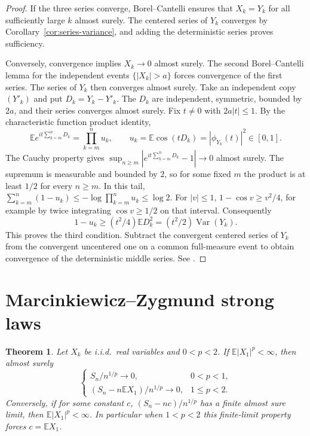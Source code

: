 \documentclass[11pt,oneside,openany]{book}
\newcommand{\E}{\mathbb{E}}
\DeclareMathOperator{\Var}{Var}
\theoremstyle{plain}
\newtheorem{theorem}{Theorem}[chapter]
\theoremstyle{definition}
\theoremstyle{remark}
\begin{document}
\begin{proof}
If the three series converge, Borel--Cantelli ensures that \(X_k=Y_k\)
for all sufficiently large \(k\) almost surely. The centered series
of \(Y_k\) converges by Corollary~\ref{cor:series-variance}, and adding
the deterministic series proves sufficiency.

Conversely, convergence implies \(X_k\to0\) almost surely. The second
Borel--Cantelli lemma for the independent events \(\{|X_k|>a\}\)
forces convergence of the first series. The series of \(Y_k\) then
converges almost surely. Take an independent copy \((Y'_k)\) and put
\(D_k=Y_k-Y'_k\). The \(D_k\) are independent, symmetric, bounded by
\(2a\), and their series converges almost surely. Fix \(t\ne0\) with
\(2a|t|\le1\). By the characteristic function product identity,
\[
  \E e^{it\sum_{k=m}^n D_k}=\prod_{k=m}^n u_k,\qquad
  u_k=\E\cos(tD_k)=|\phi_{Y_k}(t)|^2\in[0,1].
\]
The Cauchy property gives
\(\sup_{n\ge m}|e^{it\sum_{k=m}^nD_k}-1|\to0\) almost surely.
The supremum is measurable and bounded by \(2\), so for some fixed
\(m\) the product is at least \(1/2\) for every \(n\ge m\).
In this tail, \(\sum_{k=m}^n (1-u_k)\le-\log\prod_{k=m}^n u_k
\le\log 2\).
For \(|v|\le1\), \(1-\cos v\ge v^2/4\), for example by twice
integrating \(\cos v\ge 1/2\) on that interval. Consequently
\[
  1-u_k\ge (t^2/4)\E D_k^2=(t^2/2)\Var(Y_k).
\]
This proves the third condition. Subtract the convergent centered
series of \(Y_k\) from the convergent uncentered one on a common
full-measure event to obtain convergence of the deterministic middle
series. See \cite[Theorem 5.18, pp.~111--112]{Kallenberg}.
\end{proof}

\section{Marcinkiewicz--Zygmund strong laws}
\label{p08-06}

\begin{theorem}\label{thm:mz-strong}
Let \(X_k\) be i.i.d.\ real variables and \(0<p<2\).
If \(\E|X_1|^p<\infty\), then almost surely
\[
 \begin{cases}
 S_n/n^{1/p}\longrightarrow0,& 0<p<1,\\
 (S_n-n\E X_1)/n^{1/p}\longrightarrow0,& 1\le p<2 .
 \end{cases}
\]
Conversely, if for some constant \(c\), \((S_n-nc)/n^{1/p}\) has
a finite almost sure limit, then \(\E|X_1|^p<\infty\).
In particular when \(1<p<2\) this finite-limit property forces
\(c=\E X_1\).
\end{theorem}
\end{document}
